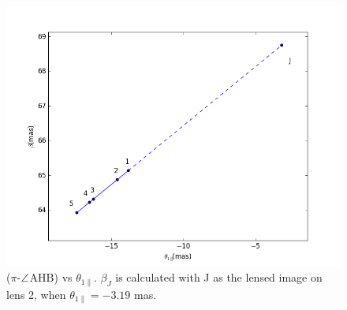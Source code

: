 \documentclass[useAMS,usenatbib]{mn2e}
\begin{document}

\begin{figure}
\centering
\includegraphics[width=1.0\linewidth]{Reflection_angle.png}
\caption{  ($\pi$-$\protect\angle$AHB) vs $\theta_{1\parallel}$.
$\beta_J$ is calculated with J as the lensed image on lens 2, when $\theta_{1\parallel}=-3.19$ mas.}
\label{vtrans}
\end{figure}
\end{document}
